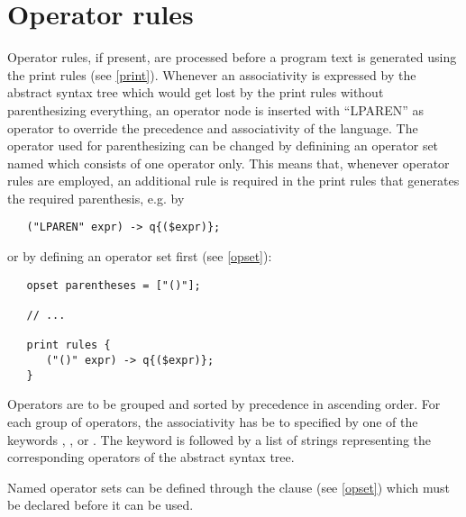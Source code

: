 \chapter{Operator rules}\label{oprules}
Operator rules, if present, are processed before a program text
is generated using the print rules (see \ref{print}). Whenever an
associativity is expressed by the abstract syntax
tree which would get lost by the print rules without parenthesizing
everything, an operator node is inserted with ``LPAREN''
as operator to override the precedence and associativity of the
language. The operator used for parenthesizing can be changed by
definining an operator set named 
which consists of one operator only. This means that, whenever operator
rules are employed, an additional rule is required in the print rules
that generates the required parenthesis, e.g. by

\begin{lstlisting}
   ("LPAREN" expr) -> q{($expr)};
\end{lstlisting}%

\noindent
or by defining an operator set first (see \ref{opset}):

\begin{lstlisting}
   opset parentheses = ["()"];

   // ...

   print rules {
      ("()" expr) -> q{($expr)};
   }
\end{lstlisting}%

\noindent
Operators are to be grouped and sorted by precedence
in ascending order. For each group of operators, the associativity has
be to specified by one of the keywords , ,
or . The keyword is followed by a list of strings
representing the corresponding operators of the abstract syntax tree.

Named operator sets can be defined through the  clause
(see \ref{opset}) which must be declared before it can be used.


